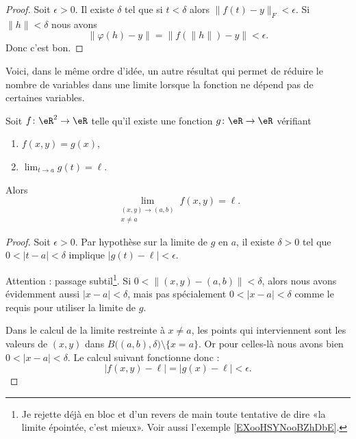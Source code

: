 \begin{proof}
    Soit \( \epsilon>0\). Il existe \( \delta\) tel que si \( t<\delta\) alors \( \| f(t)-y \|_F<\epsilon\). Si \( \| h \|<\delta\) nous avons
    \begin{equation}
        \| \varphi(h)-y \|=\| f(\| h \|)-y \|<\epsilon.
    \end{equation}
    Donc c'est bon.
\end{proof}

Voici, dans le même ordre d'idée, un autre résultat qui permet de réduire le nombre de variables dans une limite lorsque la fonction ne dépend pas de certaines variables.

\begin{lemma}        \label{LEMooYLIHooFBQyzC}
    Soit \( f\colon \eR^2\to \eR\) telle qu'il existe une fonction \( g\colon \eR\to \eR\) vérifiant
    \begin{enumerate}
        \item
            \( f(x,y)=g(x)\),
        \item
            \( \lim_{t\to a} g(t)=\ell\).
    \end{enumerate}
    Alors
    \begin{equation}
        \lim_{\substack{(x,y)\to(a,b)\\x\neq a}} f(x,y)=\ell.
    \end{equation}
\end{lemma}

\begin{proof}
    Soit \( \epsilon>0\). Par hypothèse sur la limite de \( g\) en \( a\), il existe \( \delta>0\) tel que \( 0<| t-a |<\delta\) implique \( | g(t)-\ell |<\epsilon\).

    Attention : passage subtil\footnote{Je rejette déjà en bloc et d'un revers de main toute tentative de dire «la limite épointée, c'est mieux». Voir aussi l'exemple \ref{EXooHSYNooBZhDbE}.}.  Si \( 0<\| (x,y)-(a,b) \|<\delta\), alors nous avons évidemment aussi \( | x-a |<\delta\), mais pas spécialement \( 0<| x-a |<\delta\) comme le requis pour utiliser la limite de \( g\).
    
    Dans le calcul de la limite restreinte à \( x\neq a\), les points qui interviennent sont les valeurs de \( (x,y)\) dans \( B\big( (a,b),\delta \big)\setminus\{ x=a \}\). Or pour celles-là nous avons bien \( 0<| x-a |<\delta\). Le calcul suivant fonctionne donc :
    \begin{equation}
        | f(x,y)-\ell |=| g(x)-\ell |<\epsilon.
    \end{equation}
\end{proof}

